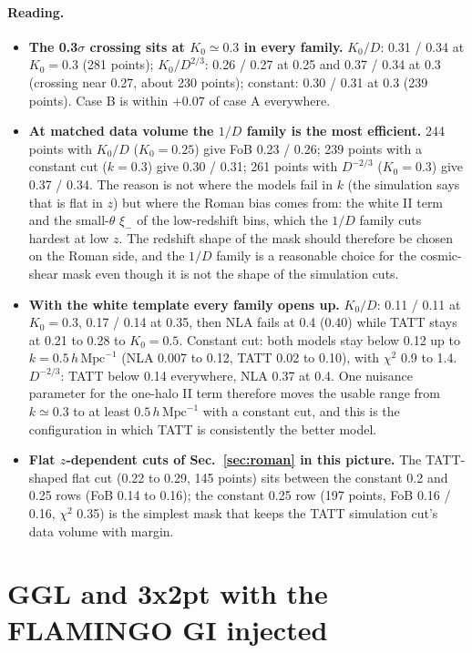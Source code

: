 \documentclass[11pt]{article}
\newcommand{\hmpc}{\,h\,\mathrm{Mpc}^{-1}}
\begin{document}
\paragraph{Reading.}
\begin{itemize}
\item \textbf{The 0.3$\sigma$ crossing sits at $K_0 \simeq 0.3$ in every family.} $K_0/D$: 0.31 / 0.34 at $K_0 = 0.3$ (281 points); $K_0/D^{2/3}$: 0.26 / 0.27 at 0.25 and 0.37 / 0.34 at 0.3 (crossing near 0.27, about 230 points); constant: 0.30 / 0.31 at 0.3 (239 points). Case B is within $+0.07$ of case A everywhere.
\item \textbf{At matched data volume the $1/D$ family is the most efficient.} 244 points with $K_0/D$ ($K_0 = 0.25$) give FoB 0.23 / 0.26; 239 points with a constant cut ($k = 0.3$) give 0.30 / 0.31; 261 points with $D^{-2/3}$ ($K_0 = 0.3$) give 0.37 / 0.34. The reason is not where the models fail in $k$ (the simulation says that is flat in $z$) but where the Roman bias comes from: the white II term and the small-$\theta$ $\xi_-$ of the low-redshift bins, which the $1/D$ family cuts hardest at low $z$. The redshift shape of the mask should therefore be chosen on the Roman side, and the $1/D$ family is a reasonable choice for the cosmic-shear mask even though it is not the shape of the simulation cuts.
\item \textbf{With the white template every family opens up.} $K_0/D$: 0.11 / 0.11 at $K_0 = 0.3$, 0.17 / 0.14 at 0.35, then NLA fails at 0.4 (0.40) while TATT stays at 0.21 to 0.28 to $K_0 = 0.5$. Constant cut: both models stay below 0.12 up to $k = 0.5\hmpc$ (NLA 0.007 to 0.12, TATT 0.02 to 0.10), with $\chi^2$ 0.9 to 1.4. $D^{-2/3}$: TATT below 0.14 everywhere, NLA 0.37 at 0.4. One nuisance parameter for the one-halo II term therefore moves the usable range from $k \simeq 0.3$ to at least $0.5\hmpc$ with a constant cut, and this is the configuration in which TATT is consistently the better model.
\item \textbf{Flat $z$-dependent cuts of Sec.~\ref{sec:roman} in this picture.} The TATT-shaped flat cut (0.22 to 0.29, 145 points) sits between the constant 0.2 and 0.25 rows (FoB 0.14 to 0.16); the constant 0.25 row (197 points, FoB 0.16 / 0.16, $\chi^2$ 0.35) is the simplest mask that keeps the TATT simulation cut's data volume with margin.
\end{itemize}

\section{GGL and 3x2pt with the FLAMINGO GI injected}\label{sec:3x2}
\end{document}
